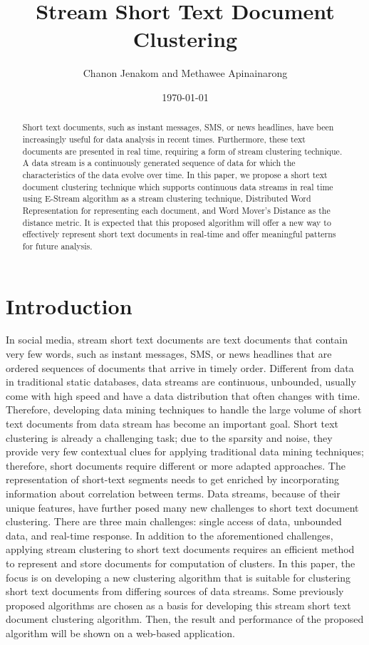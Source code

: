 \documentclass{IEEEtran}
\begin{document}
\title{\textbf{Stream Short Text Document Clustering}}
\author{Chanon Jenakom and Methawee Apinainarong}
\date{\today}
\maketitle

\begin{abstract}
Short text documents, such as instant messages, SMS, or news headlines, have been increasingly useful for data analysis in recent times. Furthermore, these text documents are presented in real time, requiring a form of stream clustering technique. A data stream is a continuously generated sequence of data for which the characteristics of the data evolve over time. In this paper, we propose a short text document clustering technique which supports continuous data streams in real time using E-Stream algorithm as a stream clustering technique, Distributed Word Representation for representing each document, and Word Mover's Distance as the distance metric. It is expected that this proposed algorithm will offer a new way to effectively represent short text documents in real-time and offer meaningful patterns for future analysis.
\end{abstract}

\section{Introduction}
In social media, stream short text documents are text documents that contain very few words, such as instant messages, SMS, or news headlines that are ordered sequences of documents that arrive in timely order. Different from data in traditional static databases, data streams are continuous, unbounded, usually come with high speed and have a data distribution that often changes with time. Therefore, developing data mining techniques to handle the large volume of short text documents from data stream has become an important goal. Short text clustering is already a challenging task; due to the sparsity and noise, they provide very few contextual clues for applying traditional data mining techniques; therefore, short documents require different or more adapted approaches. The representation of short-text segments needs to get enriched by incorporating information about correlation between terms. Data streams, because of their unique features, have further posed many new challenges to short text document clustering. There are three main challenges: single access of data, unbounded data, and real-time response. 
In addition to the aforementioned challenges, applying stream clustering to short text documents requires an efficient method to represent and store documents for computation of clusters. In this paper, the focus is on developing a new clustering algorithm that is suitable for clustering short text documents from differing sources of data streams. Some previously proposed algorithms are chosen as a basis for developing this stream short text document clustering algorithm. Then, the result and performance of the proposed algorithm will be shown on a web-based application.
\end{document}
